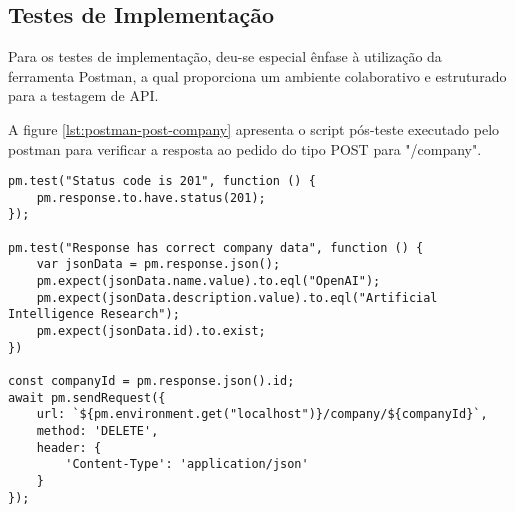 \subsection{Testes de Implementação}

Para os testes de implementação, deu-se especial ênfase à utilização da ferramenta Postman, a qual proporciona um ambiente colaborativo e estruturado para a testagem de \gls{API}.

A figure \ref{lst:postman-post-company} apresenta o script pós-teste executado pelo postman para verificar a resposta ao pedido do tipo POST para "/company". 

\begin{lstlisting}[style=Javascript, label={lst:postman-post-company}, caption={Script de test da rota POST /company}]
pm.test("Status code is 201", function () {
    pm.response.to.have.status(201);
});

pm.test("Response has correct company data", function () {
    var jsonData = pm.response.json();
    pm.expect(jsonData.name.value).to.eql("OpenAI");
    pm.expect(jsonData.description.value).to.eql("Artificial Intelligence Research");
    pm.expect(jsonData.id).to.exist;
})

const companyId = pm.response.json().id;
await pm.sendRequest({
    url: `${pm.environment.get("localhost")}/company/${companyId}`,
    method: 'DELETE',
    header: {
        'Content-Type': 'application/json'
    }
});
\end{lstlisting}

